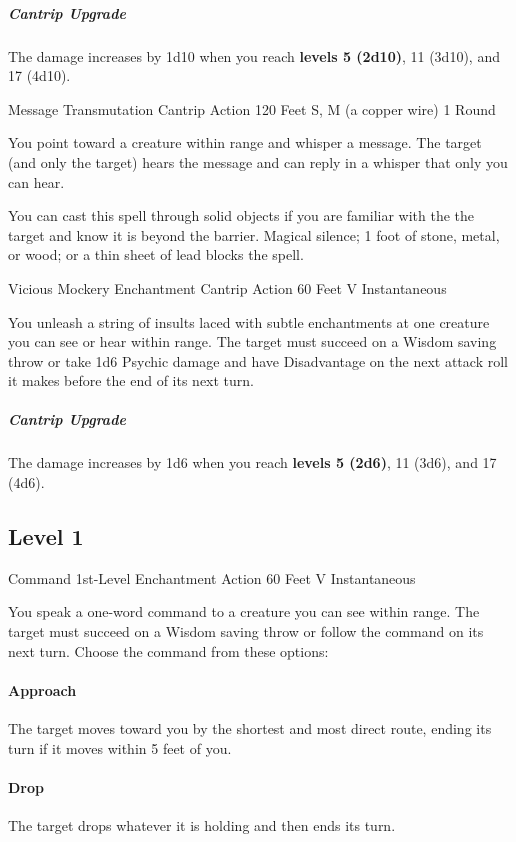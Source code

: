 \documentclass[letterpaper,openany,oneside,twocolumn]{book}
\begin{document}
\subparagraph*{Cantrip Upgrade} The damage increases by 1d10 when you reach \textbf{levels 5 (2d10)}, 11 (3d10), and 17 (4d10).

\DndSpellHeader
  {Message}
  {Transmutation Cantrip}
  {Action}
  {120 Feet}
  {S, M (a copper wire)}
  {1 Round}

You point toward a creature within range and whisper a message. The target (and only the target) hears the message and can reply in a whisper that only you can hear.

You can cast this spell through solid objects if you are familiar with the the target and know it is beyond the barrier. Magical silence; 1 foot of stone, metal, or wood; or a thin sheet of lead blocks the spell.

\DndSpellHeader
  {Vicious Mockery}
  {Enchantment Cantrip}
  {Action}
  {60 Feet}
  {V}
  {Instantaneous}

You unleash a string of insults laced with subtle enchantments at one creature you can see or hear within range. The target must succeed on a Wisdom saving throw or take 1d6 Psychic damage and have Disadvantage on the next attack roll it makes before the end of its next turn.

\subparagraph*{Cantrip Upgrade} The damage increases by 1d6 when you reach \textbf{levels 5 (2d6)}, 11 (3d6), and 17 (4d6).

\subsection*{Level 1}

\DndSpellHeader
  {Command}
  {1st-Level Enchantment}
  {Action}
  {60 Feet}
  {V}
  {Instantaneous}

You speak a one-word command to a creature you can see within range. The target must succeed on a Wisdom saving throw or follow the command on its next turn. Choose the command from these options:

\paragraph*{Approach} The target moves toward you by the shortest and most direct route, ending its turn if it moves within 5 feet of you.

\paragraph*{Drop} The target drops whatever it is holding and then ends its turn.
\end{document}
